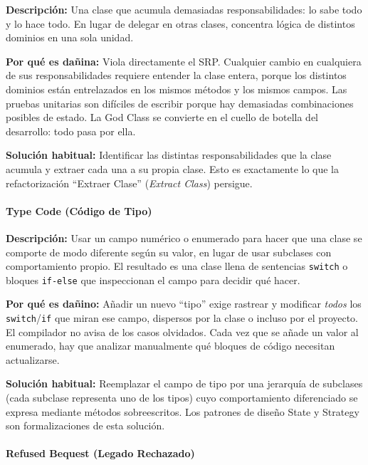 \documentclass[11pt,a4paper]{article}
\newcommand{\code}[1]{\texttt{#1}}
\begin{document}
\textbf{Descripción:} Una clase que acumula demasiadas responsabilidades:
lo sabe todo y lo hace todo.  En lugar de delegar en otras clases, concentra
lógica de distintos dominios en una sola unidad.

\textbf{Por qué es dañina:} Viola directamente el SRP.  Cualquier cambio en
cualquiera de sus responsabilidades requiere entender la clase entera, porque
los distintos dominios están entrelazados en los mismos métodos y los mismos
campos.  Las pruebas unitarias son difíciles de escribir porque hay demasiadas
combinaciones posibles de estado.  La God Class se convierte en el cuello de
botella del desarrollo: todo pasa por ella.

\textbf{Solución habitual:} Identificar las distintas responsabilidades que
la clase acumula y extraer cada una a su propia clase.  Esto es exactamente
lo que la refactorización ``Extraer Clase'' (\emph{Extract Class}) persigue.

\label{sec:fund-type-code}
\paragraph{Type Code (Código de Tipo)}

\textbf{Descripción:} Usar un campo numérico o enumerado para hacer que una
clase se comporte de modo diferente según su valor, en lugar de usar subclases
con comportamiento propio.  El resultado es una clase llena de sentencias
\code{switch} o bloques \code{if-else} que inspeccionan el campo para decidir
qué hacer.

\textbf{Por qué es dañino:} Añadir un nuevo ``tipo'' exige rastrear y
modificar \emph{todos} los \code{switch}/\code{if} que miran ese campo,
dispersos por la clase o incluso por el proyecto.  El compilador no avisa de
los casos olvidados.  Cada vez que se añade un valor al enumerado, hay que
analizar manualmente qué bloques de código necesitan actualizarse.

\textbf{Solución habitual:} Reemplazar el campo de tipo por una jerarquía de
subclases (cada subclase representa uno de los tipos) cuyo comportamiento
diferenciado se expresa mediante métodos sobreescritos.  Los patrones de diseño
State y Strategy son formalizaciones de esta solución.

\label{sec:fund-refused-bequest}
\paragraph{Refused Bequest (Legado Rechazado)}
\end{document}
